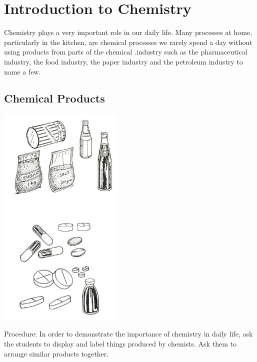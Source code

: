 \section{Introduction to Chemistry}

\begin{multicols}{2}



Chemistry plays a very important role in our
daily life. Many processes at home, particularly
in the kitchen, are chemical processes we rarely
spend a day without using products from parts
of the chemical .industry such as the
pharmaceutical industry, the food industry, the
paper industry and the petroleum industry to
name a few.


\subsection{Chemical Products}

\begin{center}
\includegraphics[width=0.45\textwidth]{./img/source/chemical-products.jpg}
\end{center}

\begin{description*}
\item[Procedure:]{In order to demonstrate the importance of
chemistry in daily life, ask the students to display
and label things produced by chemists. Ask
them to arrange similar products together.}
\end{description*}


\end{multicols}
